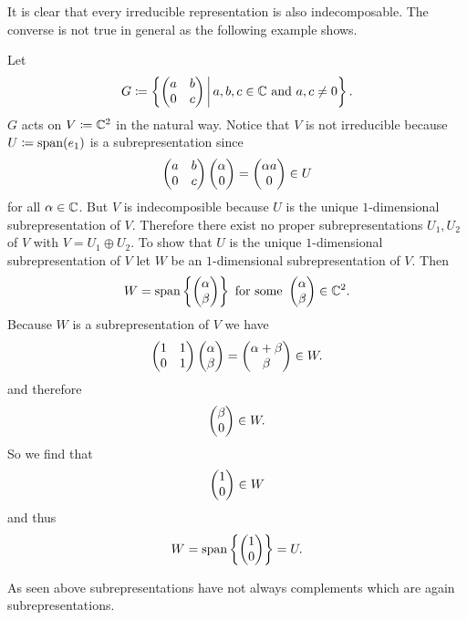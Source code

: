 It is clear that every irreducible representation is also indecomposable. The converse is not true in general as the following example shows.

\begin{expl}
 Let
 \[
  G \coloneqq \left\{ \begin{pmatrix}a&b\\0&c\end{pmatrix} \,\middle|\, a,b,c \in \mathbb{C} \text{ and } a, c \neq 0 \right\}.
 \]
 $G$ acts on $V \coloneqq \mathbb{C}^2$ in the natural way. Notice that $V$ is not irreducible because $U \coloneqq \operatorname{span}(e_1)$ is a subrepresentation since
 \[
  \begin{pmatrix}a&b\\0&c\end{pmatrix} \begin{pmatrix}\alpha\\0\end{pmatrix} = \begin{pmatrix}\alpha a\\0\end{pmatrix} \in U
 \]
 for all $\alpha \in \mathbb{C}$. But $V$ is indecomposible because $U$ is the unique $1$-dimensional subrepresentation of $V$.  Therefore there exist no proper subrepresentations $U_1, U_2$ of $V$ with $V = U_1 \oplus U_2$. To show that $U$ is the unique $1$-dimensional subrepresentation of $V$ let $W$ be an $1$-dimensional subrepresentation of $V$. Then
 \[
  W = \operatorname{span}\left\{ \begin{pmatrix}\alpha\\\beta\end{pmatrix} \right\} \text{ for some } \begin{pmatrix}\alpha\\\beta\end{pmatrix} \in \mathbb{C}^2.
 \]
 Because $W$ is a subrepresentation of $V$ we have
 \[
  \begin{pmatrix}1&1\\0&1\end{pmatrix} \begin{pmatrix}\alpha\\\beta\end{pmatrix} = \begin{pmatrix}\alpha+\beta\\\beta\end{pmatrix} \in W.
 \]
 and therefore
 \[
  \begin{pmatrix}\beta\\0\end{pmatrix} \in W.
 \]
 So we find that
 \[
  \begin{pmatrix}1\\0\end{pmatrix} \in W
 \]
 and thus
 \[
  W = \operatorname{span}\left\{\begin{pmatrix}1\\0\end{pmatrix}\right\} = U.
 \]
\end{expl}


\begin{warn}
 As seen above subrepresentations have not always complements which are again subrepresentations.
\end{warn}


